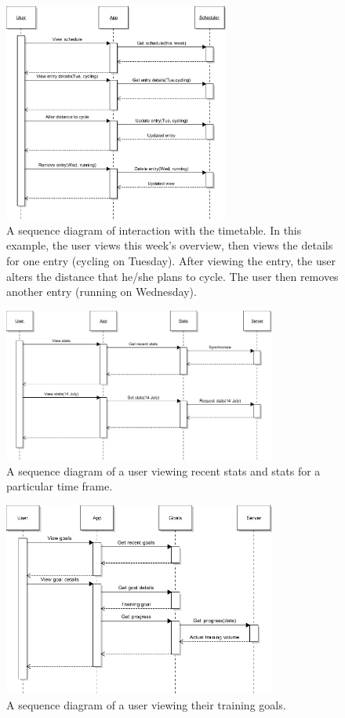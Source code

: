 \documentclass[a4paper, 11pt, titlepage]{article}
\begin{document}
\begin{figure}[H]
	\centering
	\includegraphics[width=0.66\textwidth]{figures/sequence-diagrams/AppScheduleSeq.pdf}
	\caption{A sequence diagram of interaction with the timetable. In this example, the user views this week's overview, then views the details for one entry (cycling on Tuesday). After viewing the entry, the user alters the distance that he/she plans to cycle. The user then removes another entry (running on Wednesday).}
\end{figure}

\begin{figure}[H]
	\centering
	\includegraphics[width=0.8\textwidth]{figures/sequence-diagrams/AppStatsSeq.pdf}
	\caption{A sequence diagram of a user viewing recent stats and stats for a particular time frame.}
\end{figure}

\begin{figure}[H]
	\centering
	\includegraphics[width=0.8\textwidth]{figures/sequence-diagrams/AppGoalsSeq.pdf}
	\caption{A sequence diagram of a user viewing their training goals.}
\end{figure}
\end{document}
